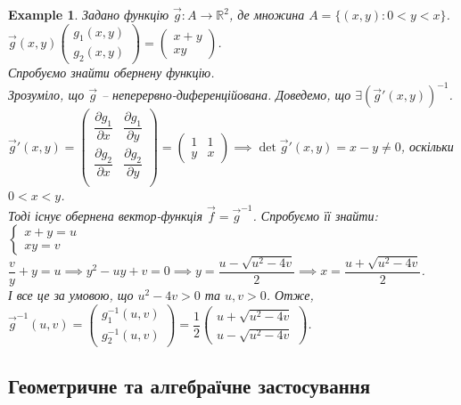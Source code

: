 \documentclass[a4paper, 10pt]{article}
\def\departial#1#2{\dfrac{\partial {#1}}{\partial {#2}}}
\theoremstyle{theoremdd}
\theoremstyle{theoremdd}
\theoremstyle{theoremdd}
\theoremstyle{theoremdd}
\theoremstyle{theoremdd}
\newtheorem{example}[theorem]{Example}
\theoremstyle{theoremdd}
\theoremstyle{theoremdd}
\theoremstyle{theoremdd}
\theoremstyle{theoremdd}
\begin{document}
\begin{example}
Задано функцію $\vec{g}\colon A \to \mathbb{R}^2$, де множина $A = \{(x,y): 0 < y < x\}$.\\
$\vec{g}(x,y) \begin{pmatrix}
g_1(x,y) \\ g_2(x,y)
\end{pmatrix} = \begin{pmatrix}
x+y \\ xy
\end{pmatrix}$.\\
Спробуємо знайти обернену функцію.\\
Зрозуміло, що $\vec{g}$ -- неперервно-диференційована. Доведемо, що $\exists (\vec{g}'(x,y))^{-1}$.\\
$\vec{g}'(x,y) = \begin{pmatrix}
\departial{g_1}{x} & \departial{g_1}{y} \\
\departial{g_2}{x} & \departial{g_2}{y} \\
\end{pmatrix} = \begin{pmatrix}
1 & 1 \\
y & x
\end{pmatrix} \implies \det \vec{g}'(x,y) = x-y \neq 0$, оскільки $0<x<y$.\\
Тоді існує обернена вектор-функція $\vec{f} = \vec{g}^{-1}$. Спробуємо її знайти:\\
$\begin{cases}
x+y = u \\
xy = v
\end{cases}$\\
$\dfrac{v}{y}+y = u \implies y^2 -uy + v = 0 \implies y = \dfrac{u-\sqrt{u^2-4v}}{2} \implies x = \dfrac{u+\sqrt{u^2-4v}}{2}$.\\
І все це за умовою, що $u^2-4v>0$ та $u,v>0$. Отже, $\vec{g}^{-1}(u,v) = \begin{pmatrix}
g_1^{-1}(u,v) \\ g_2^{-1}(u,v)
\end{pmatrix} = \dfrac{1}{2} \begin{pmatrix}
u + \sqrt{u^2-4v} \\ u-\sqrt{u^2-4v}
\end{pmatrix}$.
\end{example}
\fi

\iffalse
\subsection{Геометричне та алгебраїчне застосування}
\end{document}

